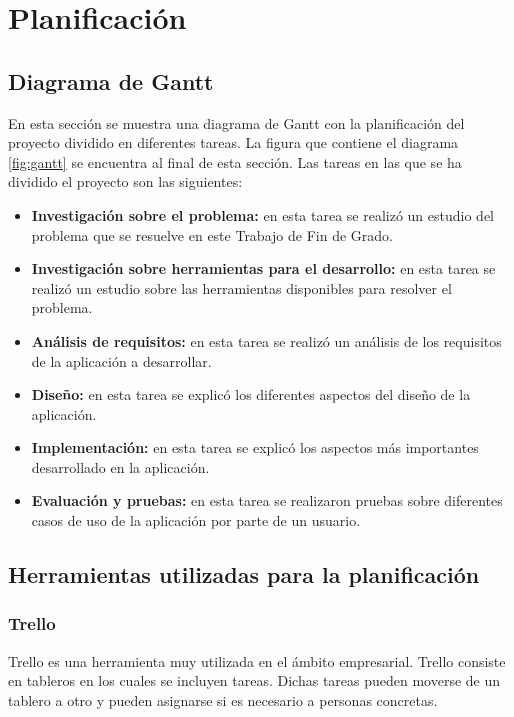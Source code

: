 \chapter{Planificación}
\section[Diagrama de Gantt]{Diagrama de Gantt}
En esta sección se muestra una diagrama de Gantt con la planificación del proyecto dividido en diferentes tareas. La figura que contiene el diagrama \ref{fig:gantt} se encuentra al final de esta sección. Las tareas en las que se ha dividido el proyecto son las siguientes:
\begin{itemize}
	\item \textbf{Investigación sobre el problema:} en esta tarea se realizó un estudio del problema que se resuelve en este Trabajo de Fin de Grado.
	\item \textbf{Investigación sobre herramientas para el desarrollo:} en esta tarea se realizó un estudio sobre las herramientas disponibles para resolver el problema.
	\item \textbf{Análisis de requisitos:} en esta tarea se realizó un análisis de los requisitos de la aplicación a desarrollar.
	\item \textbf{Diseño:} en esta tarea se explicó los diferentes aspectos del diseño de la aplicación.
	\item \textbf{Implementación:} en esta tarea se explicó los aspectos más importantes desarrollado en la aplicación.
	\item \textbf{Evaluación y pruebas:} en esta tarea se realizaron pruebas sobre diferentes casos de uso de la aplicación por parte de un usuario.
\end{itemize}

\section[Herramientas utilizadas para la planificación]{Herramientas utilizadas para la planificación}
\subsection{Trello}
Trello \cite{trello} es una herramienta muy utilizada en el ámbito empresarial. Trello consiste en tableros en los cuales se incluyen tareas. Dichas tareas pueden moverse de un tablero a otro y pueden asignarse si es necesario a personas concretas.\newline

